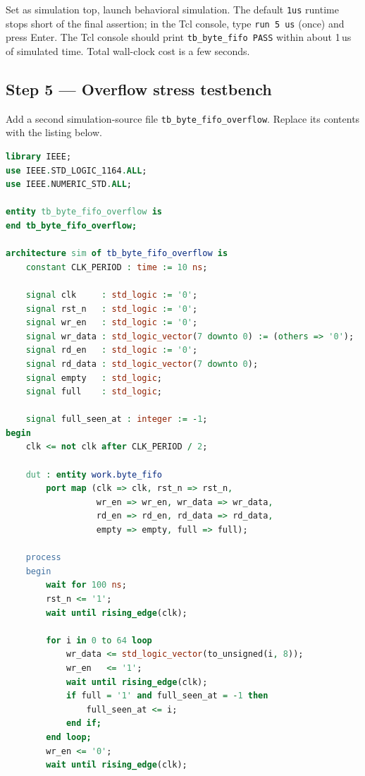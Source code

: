 \documentclass[11pt,letterpaper]{article}
\begin{document}
Set as simulation top, launch behavioral simulation. The default \texttt{1us} runtime stops short of the final assertion; in the Tcl console, type \texttt{run 5 us} (once) and press Enter. The Tcl console should print \texttt{tb\_byte\_fifo PASS} within about 1\,us of simulated time. Total wall-clock cost is a few seconds.

\subsection{Step 5 --- Overflow stress testbench}

Add a second simulation-source file \texttt{tb\_byte\_fifo\_overflow}. Replace its contents with the listing below.

\begin{lstlisting}[language=VHDL, caption={\texttt{tb\_byte\_fifo\_overflow.vhd} --- writes 65 bytes with no reads. Asserts \texttt{full} latches at depth and pointers do not corrupt.}]
library IEEE;
use IEEE.STD_LOGIC_1164.ALL;
use IEEE.NUMERIC_STD.ALL;

entity tb_byte_fifo_overflow is
end tb_byte_fifo_overflow;

architecture sim of tb_byte_fifo_overflow is
    constant CLK_PERIOD : time := 10 ns;

    signal clk     : std_logic := '0';
    signal rst_n   : std_logic := '0';
    signal wr_en   : std_logic := '0';
    signal wr_data : std_logic_vector(7 downto 0) := (others => '0');
    signal rd_en   : std_logic := '0';
    signal rd_data : std_logic_vector(7 downto 0);
    signal empty   : std_logic;
    signal full    : std_logic;

    signal full_seen_at : integer := -1;
begin
    clk <= not clk after CLK_PERIOD / 2;

    dut : entity work.byte_fifo
        port map (clk => clk, rst_n => rst_n,
                  wr_en => wr_en, wr_data => wr_data,
                  rd_en => rd_en, rd_data => rd_data,
                  empty => empty, full => full);

    process
    begin
        wait for 100 ns;
        rst_n <= '1';
        wait until rising_edge(clk);

        for i in 0 to 64 loop
            wr_data <= std_logic_vector(to_unsigned(i, 8));
            wr_en   <= '1';
            wait until rising_edge(clk);
            if full = '1' and full_seen_at = -1 then
                full_seen_at <= i;
            end if;
        end loop;
        wr_en <= '0';
        wait until rising_edge(clk);


\end{lstlisting}
\end{document}

